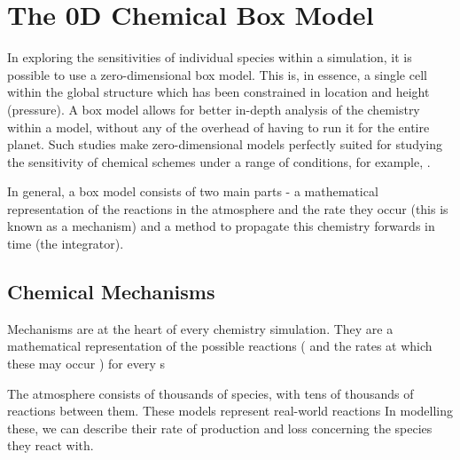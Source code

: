\section{The 0D Chemical Box Model}
In exploring the sensitivities of individual species within a simulation, it is possible to use a zero-dimensional box model. This is, in essence, a single cell within the global structure which has been constrained in location and height (pressure). A box model allows for better in-depth analysis of the chemistry within a model, without any of the overhead of having to run it for the entire planet. Such studies make zero-dimensional models perfectly suited for studying the sensitivity of chemical schemes under a range of conditions, for example, \citep{dsmacc}.

In general, a box model consists of two main parts - a mathematical representation of the reactions in the atmosphere and the rate they occur (this is known as a mechanism) and a method to propagate this chemistry forwards in time (the integrator). 

% 



\subsection{Chemical Mechanisms}
Mechanisms are at the heart of every chemistry simulation. They are a mathematical representation of the possible reactions ( and the rates at which these may occur ) for every s


The atmosphere consists of thousands of species, with tens of thousands of reactions between them.
These models represent real-world reactions
In modelling these, we can describe their rate of production and loss concerning the species they react with.


